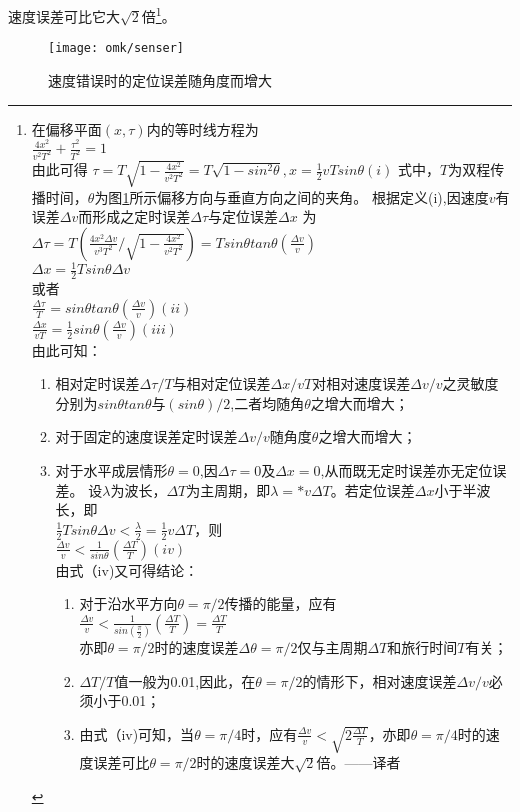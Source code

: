 速度误差可比它大$\sqrt{2}$倍\footnote{在偏移平面$(x,\tau)$内的等时线方程为\\
$\frac{4x^2}{v^2T^2}+\frac{\tau^2}{T^2}=1$\\
由此可得
$\tau=T\sqrt{1-\frac{4x^2}{v^2T^2}}=T\sqrt{1-sin^2\theta},x=\frac{1}{2}vTsin\theta (i)$
式中，$T$为双程传播时间，$\theta$为图\ref{fig:omk/senser}所示偏移方向与垂直方向之间的夹角。
根据定义(i),因速度$v$有误差$\Delta v$而形成之定时误差$\Delta \tau$与定位误差$\Delta x$
为\\
$\Delta \tau=T(\frac{4x^2\Delta v}{v^3T^2}/\sqrt{1-\frac{4x^2}{v^2T^2}})=T
sin\theta tan\theta(\frac{\Delta v}{v})$\\
$\Delta x = \frac{1}{2}Tsin\theta\Delta v$\\
或者\\
$\frac{\Delta\tau}{T}=sin\theta tan\theta(\frac{\Delta v}{v}) (ii)$\\
$\frac{\Delta x}{vT}=\frac{1}{2}sin\theta(\frac{\Delta v}{v}) (iii)$\\
由此可知：
\begin{enumerate}
\item 相对定时误差$\Delta \tau/T$与相对定位误差$\Delta x/vT$对相对速度误差$\Delta v/v$之灵敏度分别为$sin\theta tan\theta$与$(sin\theta)/2$,二者均随角$\theta$之增大而增大；
\item 对于固定的速度误差定时误差$\Delta v/v$随角度$\theta$之增大而增大；
\item 对于水平成层情形$\theta=0$,因$\Delta\tau=0$及$\Delta x=0$,从而既无定时误差亦无定位误差。
设$\lambda$为波长，$\Delta T$为主周期，即$\lambda=*v\Delta T$。若定位误差$\Delta x$小于半波长，即\\
$\frac{1}{2}Tsin\theta\Delta v<\frac{\lambda}{2}=\frac{1}{2}v\Delta T$，则\\
$\frac{\Delta v}{v}<\frac{1}{sin\theta}(\frac{\Delta T}{T} ) (iv)$\\
由式（iv)又可得结论：
\begin{enumerate}
\item 对于沿水平方向$\theta=\pi/2$传播的能量，应有\\
$\frac{\Delta v}{v}<\frac{1}{sin(\frac{\pi}{2})}(\frac{\Delta T}{T})=\frac{\Delta T}{T}$\\
亦即$\theta=\pi/2$时的速度误差$\Delta \theta=\pi/2$仅与主周期$\Delta T$和旅行时间$T$有关；
\item   $\Delta T/T$值一般为0.01,因此，在$\theta=\pi/2$的情形下，相对速度误差$\Delta v/v$必须小于0.01；
\item   由式（iv)可知，当$\theta=\pi/4$时，应有$\frac{\Delta v}{v}<\sqrt{2\frac{\Delta T}{T}}$，亦即$\theta=\pi/4$时的速度误差可比$\theta=\pi/2$时的速度误差大$\sqrt{2}$倍。——译者
\end{enumerate}
\end{enumerate}
}。
\begin{figure}[H]
\centering
\texttt{[image: omk/senser]}
\caption[senser]{速度错误时的定位误差随角度而增大}
\label{fig:omk/senser}
\end{figure}

